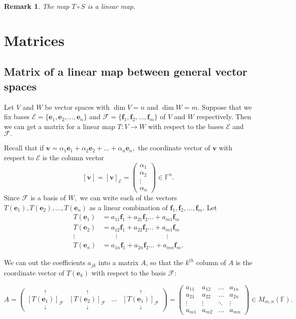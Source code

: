 \documentclass[12pt, a4paper]{article}
\newtheorem*{remark}{Remark}
\theoremstyle{definition}
\theoremstyle{plain}
\newcommand{\bb}[1]{\mathbb{#1}}
\newcommand{\vect}[1]{\mathbf{#1}}
\newcommand{\Cal}[1]{\mathcal{#1}}
\begin{document}
\begin{remark}
The map $T\circ S$ is a linear map.
\end{remark}

\section{Matrices}

\subsection{Matrix of a linear map between general vector spaces}

Let $V$ and $W$ be vector spaces with $\dim{V} = n$ and $\dim{W} = m.$ Suppose that we fix bases $\Cal{E} = \{\vect{e}_1,\vect{e}_2,...,\vect{e}_n\}$ and $\Cal{F} = \{\vect{f}_1,\vect{f}_2,...,\vect{f}_m\}$ of $V$ and $W$ respectively. Then we can get a matrix for a linear map $T : V \rightarrow W$ with respect to the bases $\Cal{E}$ and $\Cal{F}.$

Recall that if $\vect{v}=\alpha_1\vect{e}_1+\alpha_2\vect{e}_2+\ldots+\alpha_n\vect{e}_n,$ the coordinate vector of $\vect{v}$ with respect to $\Cal{E}$ is the column vector $$[\vect{v}]=[\vect{v}]_{\Cal{E}}=\begin{pmatrix} \alpha_1 \\ \alpha_2 \\ \vdots \\ \alpha_n \end{pmatrix} \in \bb{F}^n.$$ Since $\Cal{F}$ is a basis of $W,$ we can write each of the vectors $T(\vect{e}_1),T(\vect{e}_2),\ldots,T(\vect{e}_n)$ as a linear combination of $\vect{f}_1,\vect{f}_2,\ldots,\vect{f}_m.$ Let 
$$\begin{aligned}
T(\vect{e}_1) &= a_{11}\vect{f}_1+a_{21}\vect{f}_2\ldots+a_{m1}\vect{f}_m \\
T(\vect{e}_2) &= a_{12}\vect{f}_1+a_{22}\vect{f}_2\ldots+a_{m1}\vect{f}_m \\
\vdots & \qquad  \vdots \hspace{3cm} \vdots \\
T(\vect{e}_n) &= a_{1n}\vect{f}_1+a_{2n}\vect{f}_2\ldots+a_{mn}\vect{f}_m.
\end{aligned}$$

We can out the coefficients $a_{jk}$ into a matrix $A$, so that the $k^{th}$ column of $A$ is the coordinate vector of $T(\vect{e}_k)$ with respect to the basis $\Cal{F}:$

$$A = \begin{pmatrix} \underset{\downarrow}{\overset{\uparrow}{[T(\vect{e}_1)]_{\Cal{F}}}} 
& \underset{\downarrow}{\overset{\uparrow}{[T(\vect{e}_2)]_{\Cal{F}}}} 
& \ldots 
& \underset{\downarrow}{\overset{\uparrow}{[T(\vect{e}_1)]_{\Cal{F}}}}
\end{pmatrix} 
=\begin{pmatrix} 
a_{11} & a_{12} & \ldots & a_{1n} \\
a_{21} & a_{22} & \ldots & a_{2n} \\
\vdots & \vdots & \ddots & \vdots \\
a_{m1} & a_{m2} & \ldots & a_{mn}
\end{pmatrix} \in M_{m,n}(\bb{F}).$$
\end{document}
